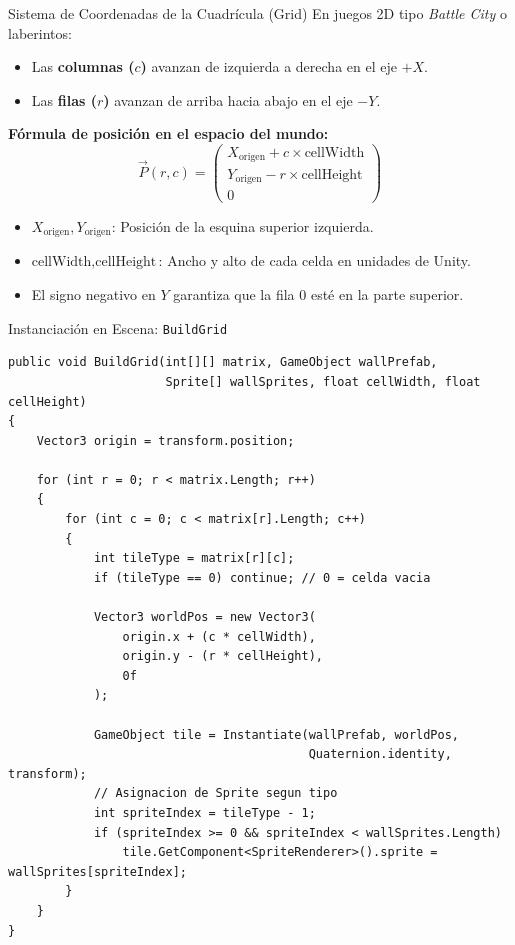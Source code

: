 \documentclass{beamer}
\begin{document}
\begin{frame}{Sistema de Coordenadas de la Cuadr\'icula (Grid)}
  En juegos 2D tipo \textit{Battle City} o laberintos:
  \begin{itemize}
    \item Las \textbf{columnas ($c$)} avanzan de izquierda a derecha en el eje $+X$.
    \item Las \textbf{filas ($r$)} avanzan de arriba hacia abajo en el eje $-Y$.
  \end{itemize}

  \vspace{0.3cm}
  \textbf{F\'ormula de posici\'on en el espacio del mundo:}
  \[
    \vec{P}(r, c) = \begin{pmatrix} X_{\text{origen}} + c \times \text{cellWidth} \\ Y_{\text{origen}} - r \times \text{cellHeight} \\ 0 \end{pmatrix}
  \]

  \vspace{0.2cm}
  \begin{itemize}
    \item $X_{\text{origen}}, Y_{\text{origen}}$: Posici\'on de la esquina superior izquierda.
    \item $\text{cellWidth}, \text{cellHeight}$: Ancho y alto de cada celda en unidades de Unity.
    \item El signo negativo en $Y$ garantiza que la fila 0 est\'e en la parte superior.
  \end{itemize}
\end{frame}

\begin{frame}[fragile]{Instanciaci\'on en Escena: \texttt{BuildGrid}}
\lstset{style=CSharpStyle}
\begin{lstlisting}
public void BuildGrid(int[][] matrix, GameObject wallPrefab, 
                      Sprite[] wallSprites, float cellWidth, float cellHeight)
{
    Vector3 origin = transform.position;

    for (int r = 0; r < matrix.Length; r++)
    {
        for (int c = 0; c < matrix[r].Length; c++)
        {
            int tileType = matrix[r][c];
            if (tileType == 0) continue; // 0 = celda vacia

            Vector3 worldPos = new Vector3(
                origin.x + (c * cellWidth),
                origin.y - (r * cellHeight),
                0f
            );

            GameObject tile = Instantiate(wallPrefab, worldPos, 
                                          Quaternion.identity, transform);
            // Asignacion de Sprite segun tipo
            int spriteIndex = tileType - 1;
            if (spriteIndex >= 0 && spriteIndex < wallSprites.Length)
                tile.GetComponent<SpriteRenderer>().sprite = wallSprites[spriteIndex];
        }
    }
}
\end{lstlisting}
\end{frame}
\end{document}
